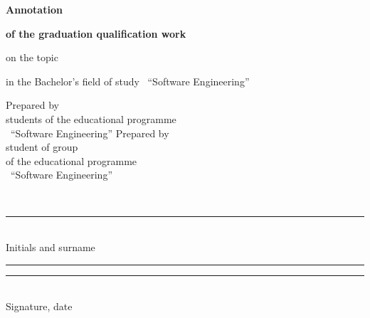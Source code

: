 \begin{titlepage}
\vspace{0.95cm}
\begin{center}
\textbf{\normalsize Annotation}

\vspace{0.12cm}
\textbf{\normalsize of the graduation qualification work}

\vspace{0.35cm}
on the topic
\underline{\makebox[0.72\textwidth][c]{\hseProjectName}}

\vspace{0.3cm}
in the Bachelor's field of study \hseProgramCode\ ``Software Engineering''
\end{center}

\vspace{0.95cm}
\noindent\hfill
\begin{minipage}[t]{0.52\textwidth}
\raggedright
\ifhseSharedDoc
Prepared by\\
students of the educational programme\\
\hseProgramCode\ ``Software Engineering''
\hseForEachAuthor{\hseAnnotationAuthorRow}
\else
Prepared by\\
student of group \hseGroup\\
of the educational programme\\
\hseProgramCode\ ``Software Engineering''

\vspace{0.25cm}
\strut\hseAuthorName\\[-0.05cm]
\rule{6cm}{0.4pt}\\[-0.05cm]
{\scriptsize Initials and surname}

\vspace{0.15cm}
\rule{3.6cm}{0.4pt}\quad\rule{2.2cm}{0.4pt}\\[-0.05cm]
{\scriptsize Signature, date}
\fi
\end{minipage}

\vfill
\begin{center}
\textbf{\hseCityEn{} \hseYear}
\end{center}
\end{titlepage}
\clearpage
